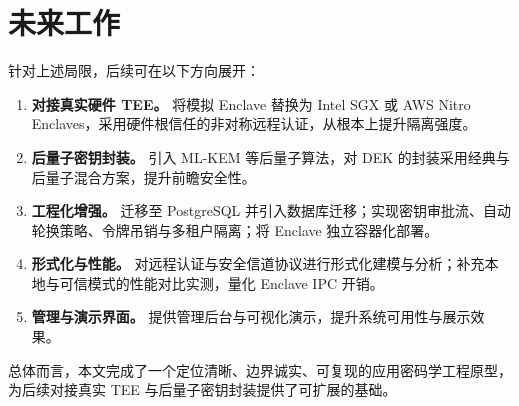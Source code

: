 \section{未来工作}

针对上述局限，后续可在以下方向展开：

\begin{enumerate}
  \item \textbf{对接真实硬件 TEE。} 将模拟 Enclave 替换为 Intel SGX 或 AWS Nitro Enclaves，采用硬件根信任的非对称远程认证，从根本上提升隔离强度。
  \item \textbf{后量子密钥封装。} 引入 ML-KEM 等后量子算法\cite{fips203}，对 DEK 的封装采用经典与后量子混合方案，提升前瞻安全性。
  \item \textbf{工程化增强。} 迁移至 PostgreSQL 并引入数据库迁移；实现密钥审批流、自动轮换策略、令牌吊销与多租户隔离；将 Enclave 独立容器化部署。
  \item \textbf{形式化与性能。} 对远程认证与安全信道协议进行形式化建模与分析；补充本地与可信模式的性能对比实测，量化 Enclave IPC 开销。
  \item \textbf{管理与演示界面。} 提供管理后台与可视化演示，提升系统可用性与展示效果。
\end{enumerate}

总体而言，本文完成了一个定位清晰、边界诚实、可复现的应用密码学工程原型，为后续对接真实 TEE 与后量子密钥封装提供了可扩展的基础。
